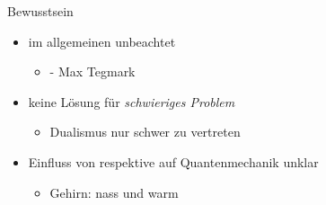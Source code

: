\begin{frame}{Bewusstsein}
	\begin{itemize}
		\item{im allgemeinen unbeachtet}
		\begin{itemize}
			\item{ - Max Tegmark\,\cite{Tegmark_15_long}}
		\end{itemize}
		\item{keine Lösung für \emph{schwieriges Problem}}
		\begin{itemize}
			\item{Dualismus nur schwer zu vertreten}
			\end{itemize}
		\item{Einfluss von respektive auf Quantenmechanik unklar}
		\begin{itemize}
			\item{Gehirn: nass und warm }
		\end{itemize}
	\end{itemize}
\end{frame}